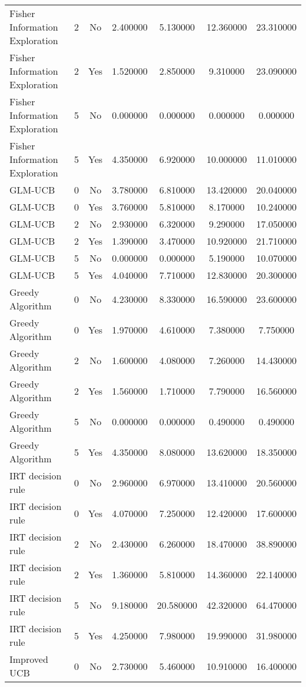 \begin{tabular}{|l|c|c|c|c|c|c|}
Fisher Information Exploration & 2 & No & 2.400000 & 5.130000 & 12.360000 & 23.310000 \\
Fisher Information Exploration & 2 & Yes & 1.520000 & 2.850000 & 9.310000 & 23.090000 \\
Fisher Information Exploration & 5 & No & 0.000000 & 0.000000 & 0.000000 & 0.000000 \\
Fisher Information Exploration & 5 & Yes & 4.350000 & 6.920000 & 10.000000 & 11.010000 \\
GLM-UCB & 0 & No & 3.780000 & 6.810000 & 13.420000 & 20.040000 \\
GLM-UCB & 0 & Yes & 3.760000 & 5.810000 & 8.170000 & 10.240000 \\
GLM-UCB & 2 & No & 2.930000 & 6.320000 & 9.290000 & 17.050000 \\
GLM-UCB & 2 & Yes & 1.390000 & 3.470000 & 10.920000 & 21.710000 \\
GLM-UCB & 5 & No & 0.000000 & 0.000000 & 5.190000 & 10.070000 \\
GLM-UCB & 5 & Yes & 4.040000 & 7.710000 & 12.830000 & 20.300000 \\
Greedy Algorithm & 0 & No & 4.230000 & 8.330000 & 16.590000 & 23.600000 \\
Greedy Algorithm & 0 & Yes & 1.970000 & 4.610000 & 7.380000 & 7.750000 \\
Greedy Algorithm & 2 & No & 1.600000 & 4.080000 & 7.260000 & 14.430000 \\
Greedy Algorithm & 2 & Yes & 1.560000 & 1.710000 & 7.790000 & 16.560000 \\
Greedy Algorithm & 5 & No & 0.000000 & 0.000000 & 0.490000 & 0.490000 \\
Greedy Algorithm & 5 & Yes & 4.350000 & 8.080000 & 13.620000 & 18.350000 \\
IRT decision rule & 0 & No & 2.960000 & 6.970000 & 13.410000 & 20.560000 \\
IRT decision rule & 0 & Yes & 4.070000 & 7.250000 & 12.420000 & 17.600000 \\
IRT decision rule & 2 & No & 2.430000 & 6.260000 & 18.470000 & 38.890000 \\
IRT decision rule & 2 & Yes & 1.360000 & 5.810000 & 14.360000 & 22.140000 \\
IRT decision rule & 5 & No & 9.180000 & 20.580000 & 42.320000 & 64.470000 \\
IRT decision rule & 5 & Yes & 4.250000 & 7.980000 & 19.990000 & 31.980000 \\
Improved UCB & 0 & No & 2.730000 & 5.460000 & 10.910000 & 16.400000 \\

\end{tabular}
